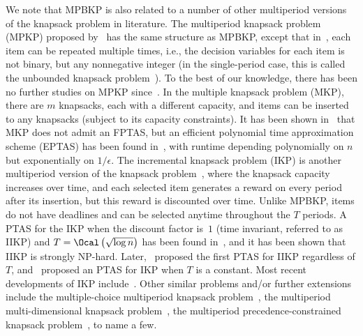 We note that MPBKP is also related to a number of other multiperiod versions of the knapsack problem in literature. The multiperiod knapsack problem (MPKP) proposed by~\cite{faaland1981multiperiod} has the same structure as  MPBKP, except that in~\cite{faaland1981multiperiod}, each item can be repeated multiple times, i.e., the decision variables for each item is not binary, but any nonnegative integer (in the single-period case, this is called the unbounded knapsack problem~\citep{andonov2000unbounded}). To the best of our knowledge, there has been no further studies on MPKP since~\cite{faaland1981multiperiod}. In the multiple knapsack problem (MKP), there are $m$ knapsacks, each with a different capacity, and items can be inserted to any knapsacks (subject to its capacity constraints). It has been shown in~\cite{chekuri2005polynomial} that MKP does not admit an FPTAS, but an efficient polynomial time approximation scheme (EPTAS) has been found in~\cite{10.1007/978-3-642-27660-6_26}, with runtime depending polynomially on $n$ but exponentially on $1/\epsilon$. The incremental knapsack problem (IKP) is another multiperiod version of the knapsack problem~\citep{10.1007/11764298_4}, where the knapsack capacity increases over time, and each selected item generates a reward on every period after its insertion, but this reward is discounted over time. Unlike MPBKP, items do not have deadlines and can be selected anytime throughout the $T$ periods. A PTAS for the IKP when the discount factor is~$1$ (time invariant, referred to as IIKP) and $T=\Ocal\left(\sqrt{\log n}\right)$ has been found in~\cite{bienstock2013approximation}, and it has been shown that IIKP is strongly NP-hard. Later,~\cite{faenza2018ptas} proposed the first PTAS for IIKP regardless of $T$, and~\cite{della2019approximating} proposed an PTAS for IKP when $T$ is a constant. Most recent developments of IKP include~\cite{aouad2020approximate,faenza2020approximation}. Other similar problems and/or further extensions include the multiple-choice multiperiod knapsack problem~\citep{randeniya1994multiple,lin2004multiple,lin2010dynamic}, the multiperiod multi-dimensional knapsack problem~\citep{lau2004multi}, the multiperiod precedence-constrained knapsack problem~\citep{moreno2010large,samavati2017methodology}, to name a few.

